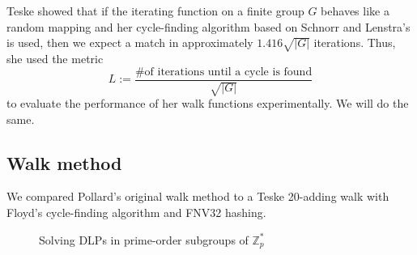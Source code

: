 \documentclass{article}
\newcommand{\ZZ}{\mathbb{Z}}
\begin{document}
Teske showed that if the iterating function on a finite group $G$ behaves like a random mapping and her cycle-finding algorithm based on Schnorr and Lenstra's is used, then we expect a match in approximately $1.416\sqrt{|G|}$ iterations. Thus, she used the metric $$L := \frac{\text{\# of iterations until a cycle is found}}{\sqrt{|G|}}$$ to evaluate the performance of her walk functions experimentally. We will do the same.

\subsection{Walk method}

We compared Pollard's original walk method to a Teske 20-adding walk with Floyd's cycle-finding algorithm and FNV32 hashing.

\begin{figure}[H]
\centering
{} \quad
{}
\caption{Solving DLPs in prime-order subgroups of $\ZZ_p^*$}
\end{figure}
\end{document}
